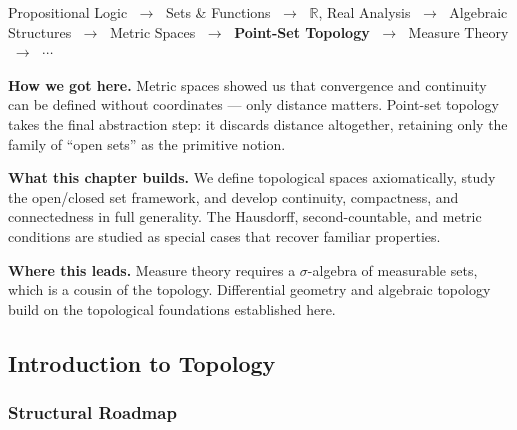 \begin{tcolorbox}[
  colback=gray!6,
  colframe=gray!40,
  arc=2pt,
  left=8pt, right=8pt, top=6pt, bottom=6pt,
  title={\small\textbf{Where You Are in the Journey}},
  fonttitle=\small\bfseries
]
\begin{center}
\small
Propositional Logic
$\;\to\;$ Sets \& Functions
$\;\to\;$ $\mathbb{R}$, Real Analysis
$\;\to\;$ Algebraic Structures
$\;\to\;$ Metric Spaces
$\;\to\;$ \textbf{Point-Set Topology}
$\;\to\;$ Measure Theory
$\;\to\;$ $\cdots$
\end{center}

\medskip
\noindent\textbf{How we got here.}
Metric spaces showed us that convergence and continuity can be defined
without coordinates --- only distance matters.
Point-set topology takes the final abstraction step: it discards
distance altogether, retaining only the family of ``open sets''
as the primitive notion.

\medskip
\noindent\textbf{What this chapter builds.}
We define topological spaces axiomatically, study the open/closed set
framework, and develop continuity, compactness, and connectedness
in full generality.
The Hausdorff, second-countable, and metric conditions are studied
as special cases that recover familiar properties.

\medskip
\noindent\textbf{Where this leads.}
Measure theory requires a $\sigma$-algebra of measurable sets, which
is a cousin of the topology.
Differential geometry and algebraic topology build on the topological
foundations established here.
\end{tcolorbox}
\vspace{1em}


\subsection{Introduction to Topology}

\subsubsection*{Structural Roadmap}

